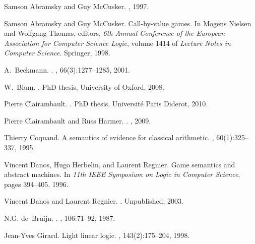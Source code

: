 \documentclass{article}
\begin{document}
\begin{thebibliography}{10}

Samson Abramsky and Guy McCusker.
, 1997.

Samson Abramsky and Guy McCusker.
\newblock Call-by-value games.
\newblock In Mogens Nielsen and Wolfgang Thomas, editors, {\em 6th Annual
  Conference of the European Association for Computer Science Logic}, volume
  1414 of {\em Lecture Notes in Computer Science}. Springer, 1998.

A.~Beckmann.
.
, 66(3):1277--1285, 2001.

W.~Blum.
.
\newblock PhD thesis, {University of Oxford}, 2008.

Pierre Clairambault.
.
\newblock PhD thesis, {Université Paris Diderot}, 2010.

Pierre Clairambault and Russ Harmer.
.
, 2009.

Thierry Coquand.
\newblock A semantics of evidence for classical arithmetic.
, 60(1):325--337, 1995.

Vincent Danos, Hugo Herbelin, and Laurent Regnier.
\newblock Game semantics and abstract machines.
\newblock In {\em 11th IEEE Symposium on Logic in Computer Science}, pages
  394--405, 1996.

Vincent Danos and Laurent Regnier.
.
\newblock Unpublished, 2003.

N.G. de~Bruijn.
.
,
  106:71--92, 1987.

Jean-Yves Girard.
\newblock Light linear logic.
, 143(2):175--204, 1998.


\end{thebibliography}
\end{document}
